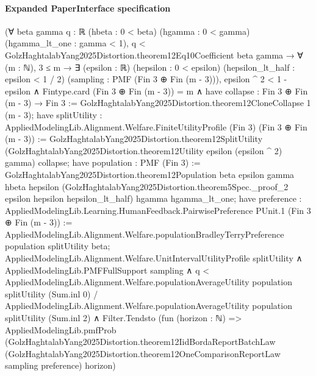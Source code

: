 \documentclass[10pt]{article}
\begin{document}
\paragraph{Expanded PaperInterface specification}
\begin{ReviewVerbatim}
(∀ {beta gamma q : ℝ} (hbeta : 0 < beta) (hgamma : 0 < gamma) (hgamma_lt_one : gamma < 1),
    q < GolzHaghtalabYang2025Distortion.theorem12Eq10Coefficient beta gamma →
      ∀ (m : ℕ),
        3 ≤ m →
          ∃ (epsilon : ℝ) (hepsilon : 0 < epsilon) (hepsilon_lt_half : epsilon < 1 / 2) (sampling :
            PMF (Fin 3 ⊕ Fin (m - 3))),
            epsilon ^ 2 < 1 - epsilon ∧
              Fintype.card (Fin 3 ⊕ Fin (m - 3)) = m ∧
                have collapse : Fin 3 ⊕ Fin (m - 3) → Fin 3 :=
                  GolzHaghtalabYang2025Distortion.theorem12CloneCollapse 1 (m - 3);
                have splitUtility :
                  AppliedModelingLib.Alignment.Welfare.FiniteUtilityProfile (Fin 3) (Fin 3 ⊕ Fin (m - 3)) :=
                  GolzHaghtalabYang2025Distortion.theorem12SplitUtility
                    (GolzHaghtalabYang2025Distortion.theorem12Utility epsilon (epsilon ^ 2) gamma) collapse;
                have population : PMF (Fin 3) :=
                  GolzHaghtalabYang2025Distortion.theorem12Population beta epsilon gamma hbeta hepsilon
                    (GolzHaghtalabYang2025Distortion.theorem5Spec._proof_2 epsilon hepsilon hepsilon_lt_half) hgamma
                    hgamma_lt_one;
                have preference :
                  AppliedModelingLib.Learning.HumanFeedback.PairwisePreference PUnit.{1} (Fin 3 ⊕ Fin (m - 3)) :=
                  AppliedModelingLib.Alignment.Welfare.populationBradleyTerryPreference population splitUtility beta;
                AppliedModelingLib.Alignment.Welfare.UnitIntervalUtilityProfile splitUtility ∧
                  AppliedModelingLib.PMFFullSupport sampling ∧
                    q <
                        AppliedModelingLib.Alignment.Welfare.populationAverageUtility population splitUtility
                            (Sum.inl 0) /
                          AppliedModelingLib.Alignment.Welfare.populationAverageUtility population splitUtility
                            (Sum.inl 2) ∧
                      Filter.Tendsto
                        (fun (horizon : ℕ) =>
                          AppliedModelingLib.pmfProb
                            (GolzHaghtalabYang2025Distortion.theorem12IidBordaReportBatchLaw
                              (GolzHaghtalabYang2025Distortion.theorem12OneComparisonReportLaw sampling preference)
                              horizon)

\end{ReviewVerbatim}
\end{document}

